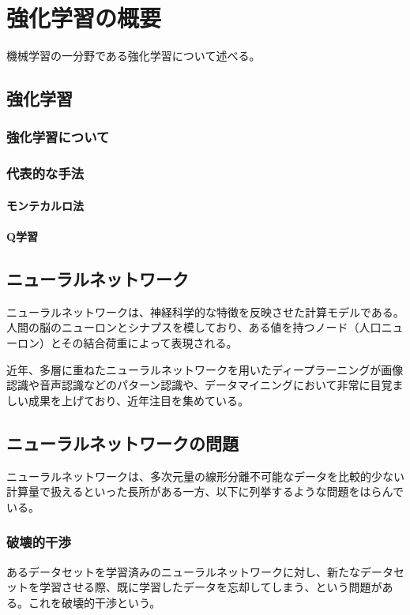 \chapter{強化学習の概要}
機械学習の一分野である強化学習について述べる。

\section{強化学習}

\subsection{強化学習について}

\subsection{代表的な手法}
\subsubsection{モンテカルロ法}
\subsubsection{Q学習}

\section{ニューラルネットワーク}
ニューラルネットワークは、神経科学的な特徴を反映させた計算モデルである。人間の脳のニューロンとシナプスを模しており、ある値を持つノード（人口ニューロン）とその結合荷重によって表現される。

近年、多層に重ねたニューラルネットワークを用いたディープラーニングが画像認識や音声認識などのパターン認識や、データマイニングにおいて非常に目覚ましい成果を上げており、近年注目を集めている。

\section{ニューラルネットワークの問題}
ニューラルネットワークは、多次元量の線形分離不可能なデータを比較的少ない計算量で扱えるといった長所がある一方、以下に列挙するような問題をはらんでいる。

\subsection{破壊的干渉}
あるデータセットを学習済みのニューラルネットワークに対し、新たなデータセットを学習させる際、既に学習したデータを忘却してしまう、という問題がある。これを破壊的干渉という。

